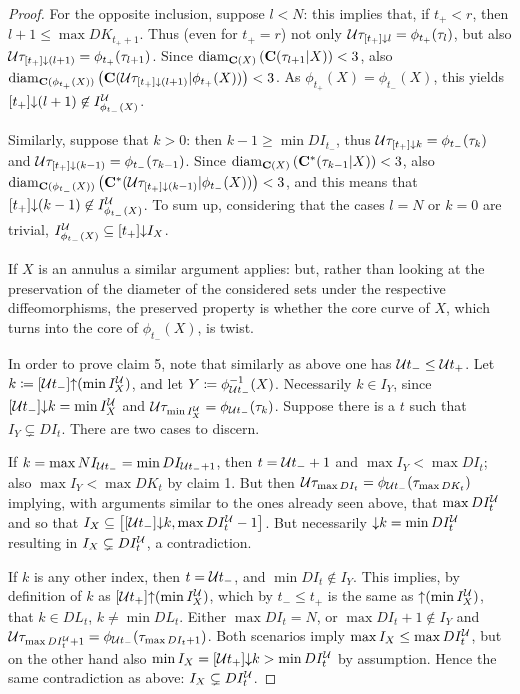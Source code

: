 \begin{proof}
For the opposite inclusion, suppose $l<N$: this implies that, if $t_+<r$, then $l+1\leq \max DK_{t_+ +1}$. Thus (even for $t_+=r$) not only ${\mathcal U}\tau_{[t_+]\mathord{\downarrow} l}=\phi_{t_+}(\tau_l)$, but also ${\mathcal U}\tau_{[t_+]\mathord{\downarrow} (l+1)}=\phi_{t_+}(\tau_{l+1})$. Since $\mathrm{diam}_{\mathbf C(X)}\left(\mathbf C(\tau_{l+1}|X)\right)<3$, also $\mathrm{diam}_{\mathbf C(\phi_{t_+}(X))}\left(\mathbf C({\mathcal U}\tau_{[t_+]\mathord{\downarrow}(l+1)}|\phi_{t_+}(X))\right)<3$. As $\phi_{t_+}(X)=\phi_{t_-}(X)$, this yields $[t_+]\mathord{\downarrow}(l+1)\not\in I_{\phi_{t_-}(X)}^{\mathcal U}$.

Similarly, suppose that $k>0$: then $k-1\geq \min DI_{t_-}$, thus ${\mathcal U}\tau_{[t_+]\mathord{\downarrow} k}=\phi_{t_-}(\tau_k)$ and ${\mathcal U}\tau_{[t_+]\mathord{\downarrow} (k-1)}=\phi_{t_-}(\tau_{k-1})$. Since $\mathrm{diam}_{\mathbf C(X)}\left(\mathbf C^*(\tau_{k-1}|X)\right)<3$, also\linebreak $\mathrm{diam}_{\mathbf C(\phi_{t_-}(X))}\left(\mathbf C^*({\mathcal U}\tau_{[t_+]\mathord{\downarrow}(k-1)}|\phi_{t_-}(X))\right)<3$, and this means that $[t_+]\mathord{\downarrow}(k-1)\not\in I_{\phi_{t_-}(X)}^{\mathcal U}$. To sum up, considering that the cases $l=N$ or $k=0$ are trivial, $I_{\phi_{t_-}(X)}^{\mathcal U}\subseteq [t_+]\mathord{\downarrow} I_X$.

If $X$ is an annulus a similar argument applies: but, rather than looking at the preservation of the diameter of the considered sets under the respective diffeomorphisms, the preserved property is whether the core curve of $X$, which turns into the core of $\phi_{t_-}(X)$, is twist.

In order to prove claim 5, note that similarly as above one has ${\mathcal U} t_-\leq {\mathcal U} t_+$. Let $k\coloneqq [{\mathcal U} t_-]\mathord{\uparrow}(\min I_X^{\mathcal U})$, and let $Y\coloneqq \phi_{{\mathcal U} t_-}^{-1}(X)$. Necessarily $k\in I_Y$, since $[{\mathcal U} t_-]\mathord{\downarrow} k=\min I_X^{\mathcal U}$ and ${\mathcal U}\tau_{\min I_X^{\mathcal U}}=\phi_{{\mathcal U} t_-}(\tau_k)$. Suppose there is a $t$ such that $I_Y\subsetneq DI_t$. There are two cases to discern.

If $k=\max NI_{{\mathcal U} t_-}=\min DI_{{\mathcal U} t_-+1}$, then $t={\mathcal U} t_-+1$ and $\max I_Y< \max DI_t$; also $\max I_Y< \max DK_t$ by claim 1. But then ${\mathcal U}\tau_{\max DI_t}=\phi_{{\mathcal U} t_-}(\tau_{\max DK_t})$ implying, with arguments similar to the ones already seen above, that $\max DI_t^{\mathcal U}$ and so that $I_X\subseteq \left[[{\mathcal U} t_-]\mathord{\downarrow} k, \max DI_t^{\mathcal U}-1\right]$. But necessarily $\mathord{\downarrow} k=\min DI_t^{\mathcal U}$ resulting in $I_X\subsetneq DI_t^{\mathcal U}$, a contradiction.

If $k$ is any other index, then $t={\mathcal U} t_-$, and $\min DI_t\not \in I_Y$. This implies, by definition of $k$ as $[{\mathcal U} t_+]\mathord{\uparrow}(\min I_X^{\mathcal U})$, which by $t_-\leq t_+$ is the same as $\mathord{\uparrow}(\min I_X^{\mathcal U})$, that $k\in DL_t$, $k\not=\min DL_t$. Either $\max DI_t=N$, or $\max DI_t+1\not\in I_Y$ and ${\mathcal U}\tau_{\max DI_t^{\mathcal U}+1}=\phi_{{\mathcal U} t_-}(\tau_{\max DI_t+1})$. Both scenarios imply $\max I_X\leq \max DI_t^{\mathcal U}$, but on the other hand also $\min I_X=[{\mathcal U} t_+]\mathord{\downarrow} k > \min DI_t^{\mathcal U}$ by assumption. Hence the same contradiction as above: $I_X\subsetneq DI_t^{\mathcal U}$.


\end{proof}
